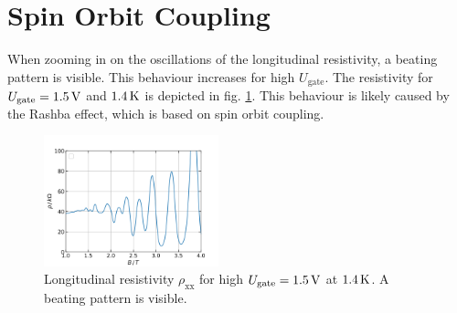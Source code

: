 \section{Spin Orbit Coupling}

When zooming in on the oscillations of the longitudinal resistivity, 
a beating pattern is visible.
This behaviour increases for high $U_\text{gate}$.
The resistivity for $U_\text{gate} = 1.5 \,\text V$ and $1.4 \,\text K$ is depicted in fig. \ref{fig:beatingPattern}.
This behaviour is likely caused by the Rashba effect, which is based on spin orbit coupling.
\begin{figure}[h]
    \centering
    \includegraphics[width=0.45\textwidth]{../Images/beatingPattern.png}
    \caption{Longitudinal resistivity $\rho_\text{xx}$ for high $U_\text{gate} = 1.5 \,\text V$ at $1.4 \,\text K$.
    A beating pattern is visible.
    }
    \label{fig:beatingPattern}
\end{figure}
